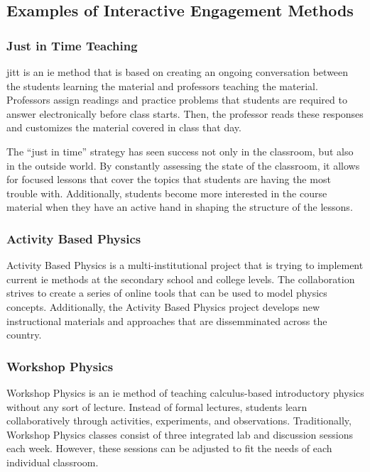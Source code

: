 \subsection{Examples of Interactive Engagement Methods}

\subsubsection{Just in Time Teaching}

\gls{jitt} is an \gls{ie} method that is based on creating an ongoing conversation between the students learning the material and professors teaching the material. Professors assign readings and practice problems that students are required to answer electronically before class starts. Then, the professor reads these responses and customizes the material covered in class that day\cite{novak1999}.

The ``just in time'' strategy has seen success not only in the classroom, but also in the outside world. By constantly assessing the state of the classroom, it allows for focused lessons that cover the topics that students are having the most trouble with. Additionally, students become more interested in the course material when they have an active hand in shaping the structure of the lessons\cite{novak1999}.

\subsubsection{Activity Based Physics}

Activity Based Physics is a multi-institutional project that is trying to implement current \gls{ie} methods at the secondary school and college levels. The collaboration strives to create a series of online tools that can be used to model physics concepts. Additionally, the Activity Based Physics project develops new instructional materials and approaches that are dissemminated across the country\cite{abp}.

\subsubsection{Workshop Physics}

Workshop Physics is an \gls{ie} method of teaching calculus-based introductory physics without any sort of lecture. Instead of formal lectures, students learn collaboratively through activities, experiments, and observations. Traditionally, Workshop Physics classes consist of three integrated lab and discussion sessions each week. However, these sessions can be adjusted to fit the needs of each individual classroom\cite{wp}.

